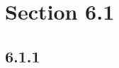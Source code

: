 \documentclass{article}
\begin{document}
\newcommand{\hr}{\par\noindent\rule{\textwidth}{0.4pt}}

\newcommand{\bc}[1]{
	\begin{equation*}
		\begin{boxed}
			{#1}
		\end{boxed}
	\end{equation*}
}

\newcommand{\cond}[2]{
	\ifmmode
		{#1} \quad {#2}
	\else
		$$ {#1} \quad {#2} $$
	\fi
}

\newcommand{\matr}[1]{
	\ifmmode \boldsymbol{#1}
	\else \textbf{\textit{#1}}
	\fi
}

\newcommand{\vect}[1]{
	\ifmmode \mathbf{#1}
	\else \textbf{#1}
	\fi
}

\tableofcontents

\section{Section 6.1}

\subsection{6.1.1}
\end{document}
